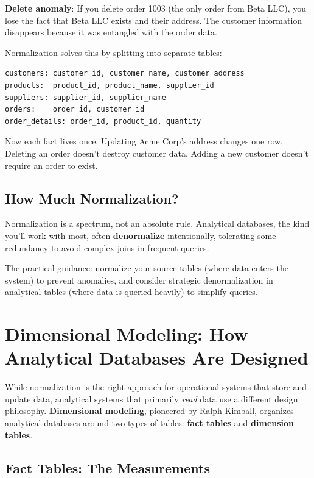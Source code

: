 \documentclass[
  letterpaper,
  DIV=11,
  numbers=noendperiod]{scrreprt}
\begin{document}
\textbf{Delete anomaly}: If you delete order 1003 (the only order from
Beta LLC), you lose the fact that Beta LLC exists and their address. The
customer information disappears because it was entangled with the order
data.

Normalization solves this by splitting into separate tables:

\begin{verbatim}
customers: customer_id, customer_name, customer_address
products:  product_id, product_name, supplier_id
suppliers: supplier_id, supplier_name
orders:    order_id, customer_id
order_details: order_id, product_id, quantity
\end{verbatim}

Now each fact lives once. Updating Acme Corp's address changes one row.
Deleting an order doesn't destroy customer data. Adding a new customer
doesn't require an order to exist.

\subsection{How Much Normalization?}\label{how-much-normalization}

Normalization is a spectrum, not an absolute rule. Analytical databases,
the kind you'll work with most, often \textbf{denormalize}
intentionally, tolerating some redundancy to avoid complex joins in
frequent queries.

The practical guidance: normalize your source tables (where data enters
the system) to prevent anomalies, and consider strategic denormalization
in analytical tables (where data is queried heavily) to simplify
queries.

\section{Dimensional Modeling: How Analytical Databases Are
Designed}\label{dimensional-modeling-how-analytical-databases-are-designed}

While normalization is the right approach for operational systems that
store and update data, analytical systems that primarily \emph{read}
data use a different design philosophy. \textbf{Dimensional modeling},
pioneered by Ralph Kimball, organizes analytical databases around two
types of tables: \textbf{fact tables} and \textbf{dimension tables}.

\subsection{Fact Tables: The
Measurements}\label{fact-tables-the-measurements}
\end{document}
